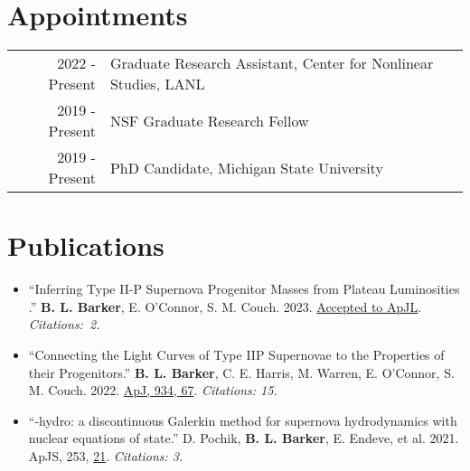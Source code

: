 \documentclass[letterpaper]{deedy-resume} %
\begin{document}
\begin{minipage}[t]{0.63\textwidth} %



\section{Appointments}
\begin{tabular}{rl}
  2022 - Present & Graduate Research Assistant, Center for Nonlinear Studies, LANL \\
  2019 - Present & NSF Graduate Research Fellow \\
  2019 - Present & PhD Candidate, Michigan State University \\
\end{tabular}

\section{Publications}
\begin{itemize}

        \item ``Inferring Type II-P Supernova Progenitor Masses from Plateau Luminosities .'' \textbf{B. L. Barker}, E. O'Connor, S. M. Couch. 2023. \href{https://doi.org/10.48550/arXiv.2211.05789}{Accepted to ApJL}. \emph{Citations:~2.}

        \item ``Connecting the Light Curves of Type IIP Supernovae to the Properties of their Progenitors.'' \textbf{B. L. Barker}, C. E. Harris, M. Warren, E. O'Connor, S. M. Couch. 2022. \href{https://doi.org/10.3847/1538-4357/ac77f3}{ApJ, 934, 67}. \emph{Citations: 15.}

        \item ``\thornado-hydro: a discontinuous Galerkin method for supernova hydrodynamics with nuclear equations of state.'' D. Pochik, \textbf{B. L. Barker}, E. Endeve, et al. 2021. ApJS, 253, \href{https://iopscience.iop.org/article/10.3847/1538-4365/abd700}{21}. \emph{Citations: 3.}


\end{itemize}
\end{minipage}
\end{document}
